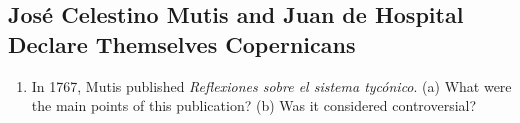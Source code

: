 \documentclass[12pt]{article}
\begin{document}
\subsection{Jos\'{e} Celestino Mutis and Juan de Hospital Declare Themselves Copernicans}

\begin{enumerate}
\item In 1767, Mutis published \textit{Reflexiones sobre el sistema tyc\'{o}nico}. (a) What were the main points of this publication?  (b) Was it considered controversial?
\end{enumerate}
\end{document}
